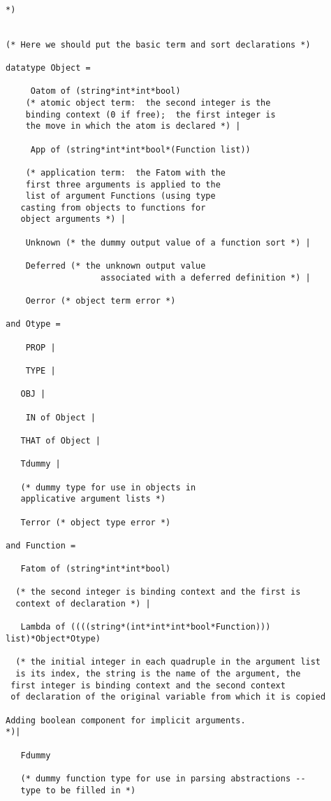 \documentclass[12pt]{article}
\begin{document}
\begin{verbatim}

*)


(* Here we should put the basic term and sort declarations *)

datatype Object =

     Oatom of (string*int*int*bool)  
    (* atomic object term:  the second integer is the
    binding context (0 if free);  the first integer is
    the move in which the atom is declared *) |

     App of (string*int*int*bool*(Function list)) 

    (* application term:  the Fatom with the 
    first three arguments is applied to the
    list of argument Functions (using type 
   casting from objects to functions for
   object arguments *) |

    Unknown (* the dummy output value of a function sort *) |

    Deferred (* the unknown output value 
                   associated with a deferred definition *) |

    Oerror (* object term error *)

and Otype =

    PROP |

    TYPE |

   OBJ |

    IN of Object |

   THAT of Object |
   
   Tdummy |
   
   (* dummy type for use in objects in
   applicative argument lists *)

   Terror (* object type error *)

and Function =

   Fatom of (string*int*int*bool)

  (* the second integer is binding context and the first is
  context of declaration *) |

   Lambda of ((((string*(int*int*int*bool*Function))) list)*Object*Otype) 

  (* the initial integer in each quadruple in the argument list
  is its index, the string is the name of the argument, the 
 first integer is binding context and the second context
 of declaration of the original variable from which it is copied 

Adding boolean component for implicit arguments.
*)|
 
   Fdummy

   (* dummy function type for use in parsing abstractions --
   type to be filled in *)


\end{verbatim}
\end{document}
